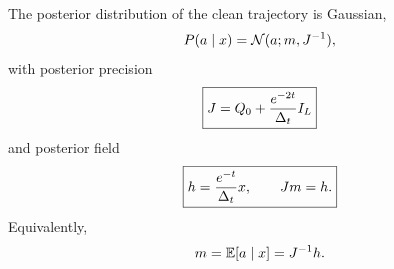 \begin{proposition}
\label{prop:g-posterior}
The posterior distribution of the clean trajectory is Gaussian,
\begin{equation}
  P(a\mid x)
  =
  \mathcal{N}(a;m,J^{-1}),
\end{equation}
with posterior precision
\begin{equation}
  \boxed{
  J
  =
  Q_0+\frac{e^{-2t}}{\Delta_t}I_L
  }
  \label{eq:g-posterior-precision}
\end{equation}
and posterior field
\begin{equation}
  \boxed{
  h
  =
  \frac{e^{-t}}{\Delta_t}x,
  \qquad
  Jm=h.
  }
  \label{eq:g-posterior}
\end{equation}
Equivalently,
\begin{equation}
  m
  =
  \mathbb{E}[a\mid x]
  =
  J^{-1}h.
  \label{eq:g-posterior-mean}
\end{equation}
\end{proposition}

